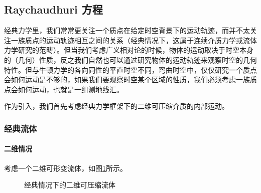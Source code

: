 \documentclass[hyperref, UTF8, a4paper]{ctexart}
\begin{document}
\subsection{Raychaudhuri 方程}

经典力学里，我们常常更关注一个质点在给定时空背景下的运动轨迹，而并不太关注一族质点的运动轨迹相互之间的关系（经典情况下，这属于连续介质力学或流体力学研究的范畴）。但当我们考虑广义相对论的时候，物体的运动取决于时空本身的（几何）性质，反之我们自然也可以通过研究物体的运动轨迹来观察时空的几何特性。但与牛顿力学的各向同性的平直时空不同，弯曲时空中，仅仅研究一个质点会如何运动是不够的，如果我们要观察时空某个区域的性质，我们必须考虑一族质点会如何运动，也就是一组测地线汇。



作为引入，我们首先考虑经典力学框架下的二维可压缩介质的内部运动。


\subsubsection{经典流体}
\paragraph{二维情况}

考虑一个二维可形变流体，如图\ref{fig:classic_fluid}所示。

\begin{figure}
	\centering
	
	\caption{经典情况下的二维可压缩流体}
	\label{fig:classic_fluid}
\end{figure}
\end{document}
